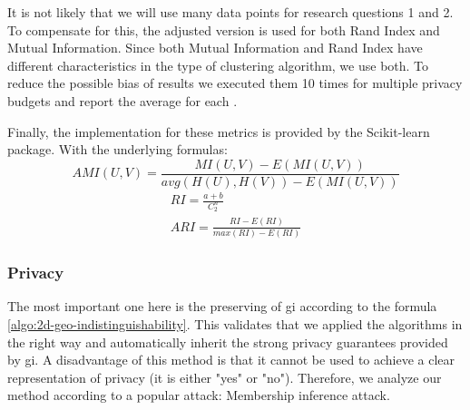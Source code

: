 It is not likely that we will use many data points for research questions 1 and 2.
To compensate for this, the adjusted version is used for both Rand Index and Mutual Information.
Since both Mutual Information and Rand Index have different characteristics in the type of clustering algorithm, we use both.
To reduce the possible bias of results we executed them 10 times for multiple privacy budgets and report the average for each \citep{9679364}.

Finally, the implementation for these metrics is provided by the Scikit-learn package.
With the underlying formulas:
\begin{equation}
  AMI(U, V) = \frac{MI(U, V) - E(MI(U, V))}{avg(H(U), H(V)) - E(MI(U, V))}
\end{equation}
\begin{gather}
  RI = \frac{a + b}{C^{n}_{2}} \\
  ARI = \frac{RI - E(RI)}{max(RI) - E(RI)}
\end{gather}


\subsubsection{Privacy}
The most important one here is the preserving of \gls{gi} according to the formula \ref{algo:2d-geo-indistinguishability}.
This validates that we applied the algorithms in the right way and automatically inherit the strong privacy guarantees provided by \gls{gi}.
A disadvantage of this method is that it cannot be used to achieve a clear representation of privacy (it is either "yes" or "no").
Therefore, we analyze our method according to a popular attack: Membership inference attack.

